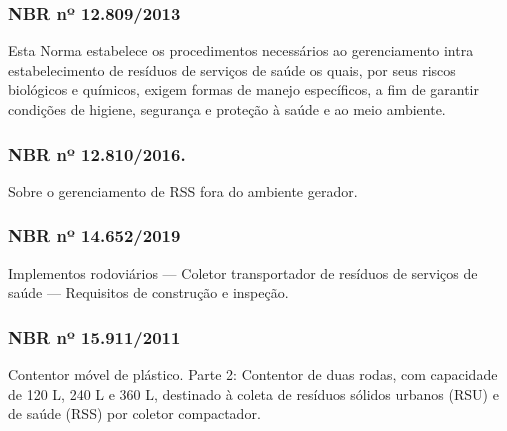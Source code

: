 \begin{subapend}
\begin{subsubapend}
		\subsubsection{NBR nº 12.809/2013}
		Esta Norma estabelece os procedimentos necessários ao gerenciamento intra estabelecimento de resíduos de serviços de saúde os quais, por seus riscos biológicos e químicos, exigem formas de manejo específicos, a fim de garantir condições de higiene, segurança e proteção à saúde e ao meio ambiente.
		\subsubsection{NBR nº 12.810/2016.}
		Sobre o gerenciamento de RSS fora do ambiente gerador.
		\subsubsection{NBR nº 14.652/2019}
		Implementos rodoviários — Coletor transportador de resíduos de serviços de saúde — Requisitos de construção e inspeção.
		\subsubsection{NBR nº 15.911/2011}
		Contentor móvel de plástico. Parte 2: Contentor de duas rodas, com capacidade de 120 L, 240 L e 360 L, destinado à coleta de resíduos sólidos urbanos (RSU) e de saúde (RSS) por coletor compactador.
	\end{subsubapend}
\end{subapend}


